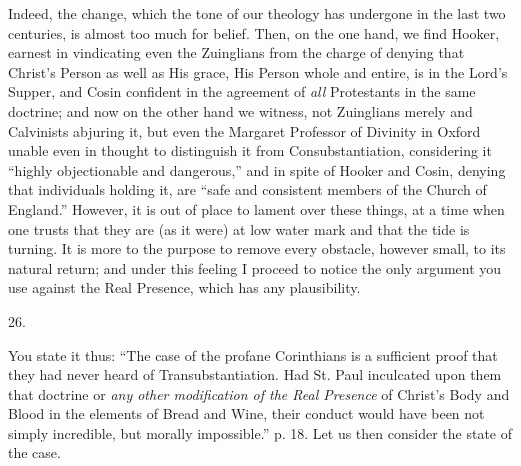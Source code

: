 Indeed, the change, which the tone of our
theology has undergone in the last two centuries, is almost too much
for belief. Then, on the one hand, we find Hooker, earnest in
vindicating even the Zuinglians from the charge of denying that Christ's
Person as well as His grace, His Person whole and entire, is in the
Lord's Supper, and Cosin confident in the agreement of \emph{all}
Protestants in the same doctrine; and now on the other hand we
witness, not Zuinglians merely and Calvinists abjuring it, but even
the Margaret Professor of Divinity in Oxford unable even in thought to
distinguish it from Consubstantiation, considering it ``highly
objectionable and dangerous,'' and in spite of Hooker and Cosin,
denying that individuals holding it, are ``safe and consistent members
of the Church of England.'' However, it is out of place to lament over
these things, at a time when one trusts that they are (as it were) at
low water mark and that the tide is turning. It is more to the purpose
to remove every obstacle, however small, to its natural return; and
under this feeling I proceed to notice the only argument you use
against the Real Presence, which has any plausibility.

26.

You state it thus: ``The case of the profane
Corinthians is a sufficient proof that they had never heard of Transubstantiation. Had St. Paul inculcated upon them that doctrine or
\emph{any other modification of the Real Presence} of Christ's Body
and Blood in the elements of Bread and Wine, their conduct would
have been not simply incredible, but morally impossible.'' p. 18. Let
us then consider the state of the case.

